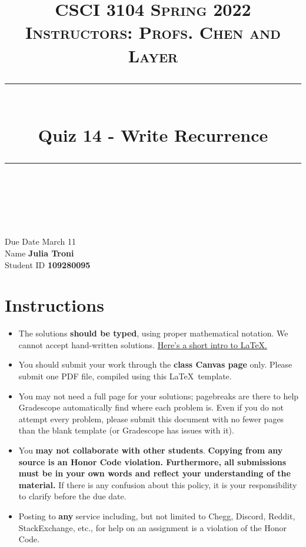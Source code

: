 \documentclass[11pt]{article}
\title{
\normalfont \normalsize 
\textsc{CSCI 3104 Spring 2022 \\ 
Instructors: Profs. Chen and Layer} \\
[10pt] 
\rule{\linewidth}{0.5pt} \\[6pt] 
\huge Quiz 14 - Write Recurrence\\
\rule{\linewidth}{2pt}  \\[10pt]
}
\date{}
\theoremstyle{definition}
\theoremstyle{definition}
\theoremstyle{definition}
\begin{document}

\maketitle


\noindent
Due Date \dotfill March 11 \\
Name \dotfill \textbf{Julia Troni} \\
Student ID \dotfill \textbf{109280095} \\


\tableofcontents

\section{Instructions}
 \begin{itemize}
	\item The solutions \textbf{should be typed}, using proper mathematical notation. We cannot accept hand-written solutions. \href{http://ece.uprm.edu/~caceros/latex/introduction.pdf}{Here's a short intro to \LaTeX.}
	\item You should submit your work through the \textbf{class Canvas page} only. Please submit one PDF file, compiled using this \LaTeX \ template.
	\item You may not need a full page for your solutions; pagebreaks are there to help Gradescope automatically find where each problem is. Even if you do not attempt every problem, please submit this document with no fewer pages than the blank template (or Gradescope has issues with it).

	\item You \textbf{may not collaborate with other students}. \textbf{Copying from any source is an Honor Code violation. Furthermore, all submissions must be in your own words and reflect your understanding of the material.} If there is any confusion about this policy, it is your responsibility to clarify before the due date. 

	\item Posting to \textbf{any} service including, but not limited to Chegg, Discord, Reddit, StackExchange, etc., for help on an assignment is a violation of the Honor Code.
\end{itemize}
\end{document}
